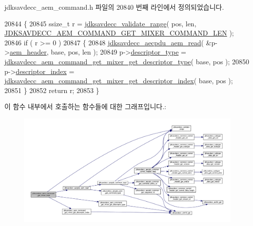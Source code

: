 jdksavdecc\+\_\+aem\+\_\+command.\+h 파일의 20840 번째 라인에서 정의되었습니다.


\begin{DoxyCode}
20844 \{
20845     ssize\_t r = \hyperlink{group__util_ga9c02bdfe76c69163647c3196db7a73a1}{jdksavdecc\_validate\_range}( pos, len, 
      \hyperlink{group__command__get__mixer_gaa8242449700246096e957232cf625ed3}{JDKSAVDECC\_AEM\_COMMAND\_GET\_MIXER\_COMMAND\_LEN} );
20846     \textcolor{keywordflow}{if} ( r >= 0 )
20847     \{
20848         \hyperlink{group__aecpdu__aem_gae2421015dcdce745b4f03832e12b4fb6}{jdksavdecc\_aecpdu\_aem\_read}( &p->\hyperlink{structjdksavdecc__aem__command__get__mixer_ae1e77ccb75ff5021ad923221eab38294}{aem\_header}, base, pos, len );
20849         p->\hyperlink{structjdksavdecc__aem__command__get__mixer_ab7c32b6c7131c13d4ea3b7ee2f09b78d}{descriptor\_type} = 
      \hyperlink{group__command__get__mixer_ga78a91c078980c39650c6d42d8f332793}{jdksavdecc\_aem\_command\_get\_mixer\_get\_descriptor\_type}( 
      base, pos );
20850         p->\hyperlink{structjdksavdecc__aem__command__get__mixer_a042bbc76d835b82d27c1932431ee38d4}{descriptor\_index} = 
      \hyperlink{group__command__get__mixer_ga92f6563898a4ca71092ee8e18673300c}{jdksavdecc\_aem\_command\_get\_mixer\_get\_descriptor\_index}(
       base, pos );
20851     \}
20852     \textcolor{keywordflow}{return} r;
20853 \}
\end{DoxyCode}


이 함수 내부에서 호출하는 함수들에 대한 그래프입니다.\+:
\nopagebreak
\begin{figure}[H]
\begin{center}
\leavevmode
\includegraphics[width=350pt]{group__command__get__mixer_gaadf921db77a50a29dcb2c437b93e6d5e_cgraph}
\end{center}
\end{figure}


